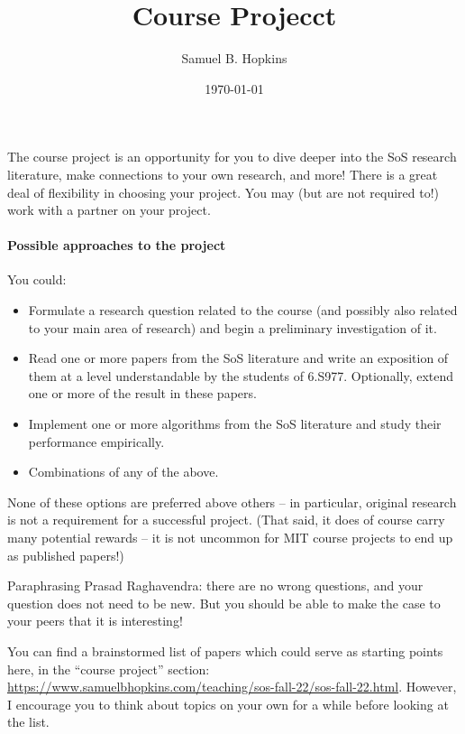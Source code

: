 \documentclass[11pt]{article}
\title{Course Projecct}
\author{Samuel B. Hopkins}
\date{\today}
\theoremstyle{definition}
\begin{document}
\maketitle

The course project is an opportunity for you to dive deeper into the SoS research literature, make connections to your own research, and more! There is a great deal of flexibility in choosing your project.
You may (but are not required to!) work with a partner on your project.

\paragraph{Possible approaches to the project}
You could:
\begin{itemize}
\item Formulate a research question related to the course (and possibly also related to your main area of research) and begin a preliminary investigation of it.
\item Read one or more papers from the SoS literature and write an exposition of them at a level understandable by the students of 6.S977. Optionally, extend one or more of the result in these papers.
\item Implement one or more algorithms from the SoS literature and study their performance empirically.
\item Combinations of any of the above.
\end{itemize}

None of these options are preferred above others -- in particular, original research is not a requirement for a successful project. (That said, it does of course carry many potential rewards --  it is not uncommon for MIT course projects to end up as published papers!)

Paraphrasing Prasad Raghavendra: there are no wrong questions, and your question does not need to be new. But you should be able to make the case to your peers that it is interesting!

You can find a brainstormed list of papers which could serve as starting points here, in the ``course project'' section: \url{https://www.samuelbhopkins.com/teaching/sos-fall-22/sos-fall-22.html}.
However, I encourage you to think about topics on your own for a while before looking at the list.
\end{document}
